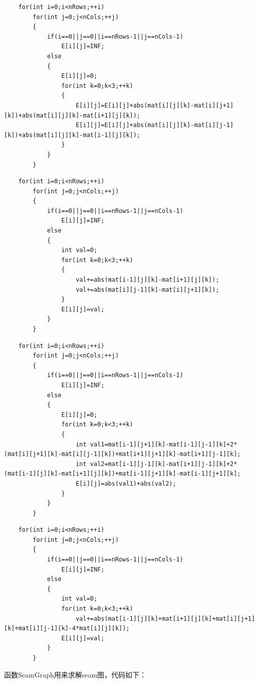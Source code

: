 \documentclass{ctexart}
\begin{document}
\begin{lstlisting}
	for(int i=0;i<nRows;++i)
		for(int j=0;j<nCols;++j)
		{
			if(i==0||j==0||i==nRows-1||j==nCols-1)
				E[i][j]=INF;
			else
			{
				E[i][j]=0;
				for(int k=0;k<3;++k)
				{
					E[i][j]=E[i][j]+abs(mat[i][j][k]-mat[i][j+1][k])+abs(mat[i][j][k]-mat[i+1][j][k]);
					E[i][j]=E[i][j]+abs(mat[i][j][k]-mat[i][j-1][k])+abs(mat[i][j][k]-mat[i-1][j][k]);
				}
			}
		}
\end{lstlisting}
\begin{lstlisting}
	for(int i=0;i<nRows;++i)
		for(int j=0;j<nCols;++j)
		{
			if(i==0||j==0||i==nRows-1||j==nCols-1)
				E[i][j]=INF;
			else
			{
				int val=0;
				for(int k=0;k<3;++k)
				{
					val+=abs(mat[i-1][j][k]-mat[i+1][j][k]);
					val+=abs(mat[i][j-1][k]-mat[i][j+1][k]);
				}
				E[i][j]=val;
			}
		}
\end{lstlisting}
\begin{lstlisting}
	for(int i=0;i<nRows;++i)
		for(int j=0;j<nCols;++j)
		{
			if(i==0||j==0||i==nRows-1||j==nCols-1)
				E[i][j]=INF;
			else
			{
				E[i][j]=0;
				for(int k=0;k<3;++k)
				{
					int val1=mat[i-1][j+1][k]-mat[i-1][j-1][k]+2*(mat[i][j+1][k]-mat[i][j-1][k])+mat[i+1][j+1][k]-mat[i+1][j-1][k];
					int val2=mat[i-1][j-1][k]-mat[i+1][j-1][k]+2*(mat[i-1][j][k]-mat[i+1][j][k])+mat[i-1][j+1][k]-mat[i-1][j+1][k];
					E[i][j]=abs(val1)+abs(val2);
				}
			}
		}
\end{lstlisting}
\begin{lstlisting}
	for(int i=0;i<nRows;++i)
		for(int j=0;j<nCols;++j)
		{
			if(i==0||j==0||i==nRows-1||j==nCols-1)
				E[i][j]=INF;
			else
			{
				int val=0;
				for(int k=0;k<3;++k)
					val+=abs(mat[i-1][j][k]+mat[i+1][j][k]+mat[i][j+1][k]+mat[i][j-1][k]-4*mat[i][j][k]);
				E[i][j]=val;
			}
		}
\end{lstlisting}
函数SeamGraph用来求解seam图，代码如下：
\end{document}
